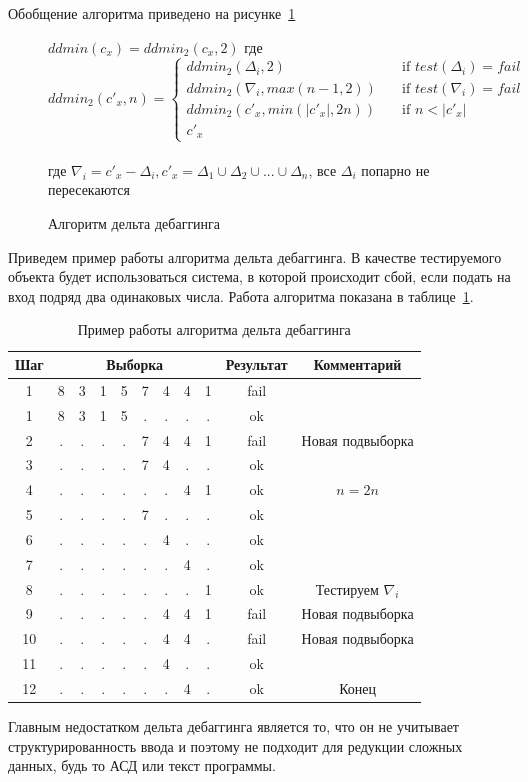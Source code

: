 Обобщение алгоритма приведено на рисунке~\ref{ddminalg}
\begin{figure}
	$ddmin(c_x) = ddmin_2(c_x, 2)$ где \\
\[ ddmin_2(c'_x, n) =
  \begin{cases}
    ddmin_2(\Delta_i, 2)       & \quad \text{if } test(\Delta_i) = fail\\
    ddmin_2(\nabla_i, max(n - 1, 2))       & \quad \text{if } test(\nabla_i) = fail\\
    ddmin_2(c'_x, min(|c'_x|, 2n))       & \quad \text{if } n < |c'_x|\\
    c'_x
  \end{cases}
\]
\\
где $\nabla_i = c'_x - \Delta_i, c'_x = \Delta_1 \cup \Delta_2 \cup ... \cup \Delta_n$, все $\Delta_i$ попарно не пересекаются
\caption{Алгоритм дельта дебаггинга}
\label{ddminalg}
\end{figure}
Приведем пример работы алгоритма дельта дебаггинга. В качестве тестируемого объекта будет использоваться система, в которой происходит сбой, если подать на вход подряд два одинаковых числа. Работа алгоритма показана в таблице~\ref{tab:ddminex2}.
\begin{table}[]
\center
\caption{\label{tab:ddminex2}Пример работы алгоритма дельта дебаггинга}
\begin{tabular}{| c | *{8}{c} | c | c |}
\hline
\bf Шаг & \multicolumn{8}{|c|}{\bf Выборка} & {\bf Результат} & {\bf Комментарий}\\
\hline
1 &  8 & 3 & 1 & 5 & 7 & 4 & 4 & 1  & fail & \\
\hline
1 &  8 & 3 & 1 & 5 & . & . & . & .  & ok & \\
\hline
2 &  . & . & . & . & 7 & 4 & 4 & 1 & fail & Новая подвыборка\\
\hline
3 &  . & . & . & . & 7 & 4 & . & . & ok & \\
\hline
4 &  . & . & . & . & . & . & 4 & 1 & ok & $n = 2n$\\
\hline
5 &  . & . & . & . & 7 & . & . & . & ok & \\
\hline
6 &  . & . & . & . & . & 4 & . & . & ok &\\
\hline
7 &  . & . & . & . & . & . & 4 & . & ok &\\
\hline
8 &  . & . & . & . & . & . & . & 1 & ok &Тестируем $\nabla_i$\\
\hline
9 &  . & . & . & . & . & 4 & 4 & 1 & fail &Новая подвыборка\\
\hline
10 &  . & . & . & . & . & 4 & 4 & . & fail &Новая подвыборка\\
\hline
11 &  . & . & . & . & . & 4 & . & . & ok &\\
\hline
12 &  . & . & . & . & . & . & 4 & . & ok & Конец\\
\hline
\end{tabular}
\end{table}
Главным недостатком дельта дебаггинга является то, что он не учитывает структурированность ввода и поэтому не подходит для редукции сложных данных, будь то АСД или текст программы.
